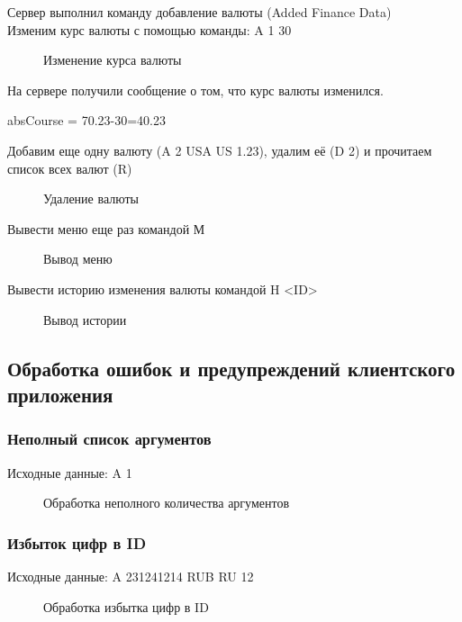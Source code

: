 \documentclass[a4paper,14pt]{article}
\begin{document}
Сервер выполнил команду добавление валюты (Added Finance Data)\\

Изменим курс валюты с помощью команды: A 1 30
\begin{figure}[h!]
	\noindent\centering{
		\texttt{[image: 6]}}
	\caption{Изменение курса валюты}
	\label{figCurves}
\end{figure}

На сервере получили сообщение о том, что курс валюты изменился. 

absCourse = 70.23-30=40.23

Добавим еще одну валюту (A 2 USA US 1.23), удалим её (D 2) и прочитаем список всех валют (R)
\begin{figure}[h!]
	\noindent\centering{
		\texttt{[image: 7]}}
	\caption{Удаление валюты}
	\label{figCurves}
\end{figure}
\newpage

Вывести меню еще раз командой М

\begin{figure}[h!]
	\noindent\centering{
		\texttt{[image: 8]}}
	\caption{Вывод меню}
	\label{figCurves}
\end{figure}

Вывести историю изменения валюты командой H <ID>

\begin{figure}[h!]
	\noindent\centering{
		\texttt{[image: 9]}}
	\caption{Вывод истории}
	\label{figCurves}
\end{figure}
\newpage
\subsection {Обработка ошибок и предупреждений клиентского приложения}

\subsubsection {Неполный список аргументов}
Исходные данные: A 1

\begin{figure}[h!]
	\noindent\centering{
		\texttt{[image: 15]}}
	\caption{Обработка неполного количества аргументов}
	\label{figCurves}
\end{figure}

\subsubsection {Избыток цифр в ID}
Исходные данные: A 231241214 RUB RU 12
\begin{figure}[h!]
	\noindent\centering{
		\texttt{[image: 16]}}
	\caption{Обработка избытка цифр в ID}
	\label{figCurves}
\end{figure}
\end{document}

